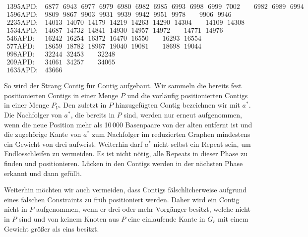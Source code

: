 \begin{footnotesize}
\begin{align*}
\text{1395APD:}&\ 6877\ \ \,6943\ \ \,6977\ \ \,6979\ \ \,6980\ \ \,6982\ \ \,6985\ \ \,6993\ \ \,6998\ \ \,6999\ \ \,7002\quad\quad 6982\ \ \, 6989\ \ \,6994\\
\text{1596APD:}&\ 9809\ \ \,9867\ \ \,9903\ \ \,9931\ \ \,9939\ \ \,9942\ \ \,9951\ \ \,9978\quad\quad 9906\ \ \,9946\\
\text{2235APD:}&\ 14013\ \ \,14070\ \ \,14179\ \ \,14219\ \ \,14263\ \ \,14290\ \ \,14304\quad\quad 14109\ \ \,14308\\
\text{1534APD:}&\ 14687\ \ \,14732\ \ \,14841\ \ \,14930\ \ \,14957\ \ \,14972\quad\quad 14771\ \ \,14976\\
\text{546APD:}&\ 16242\ \ \,16254\ \ \,16372\ \ \,16470\ \ \,16550\quad\quad 16293\ \ \,16554\\
\text{577APD:}&\ 18659\ \ \,18782\ \ \,18967\ \ \,19040\ \ \,19081\quad\quad 18698\ \ \,19044\\
\text{998APD:}&\ 32244\ \ \,32453\quad\quad 32248\\
\text{209APD:}&\ 34061\ \ \,34257\quad\quad 34065\\
\text{1635APD:}&\ 43666
\end{align*}
\end{footnotesize}

So wird der Strang Contig für Contig aufgebaut. Wir sammeln die bereits fest positionierten Contigs in einer Menge $P$ und die vorläufig positionierten Contigs in einer Menge $P_V$. %
Den zuletzt in $P$ hinzugefügten Contig bezeichnen wir mit $a^*$.
Die Nachfolger von $a^*$, die bereits in $P$ sind, werden 
nur erneut aufgenommen, wenn die neue Position mehr als 10\,000 Basenpaare von der alten entfernt ist und die zugehörige Kante von $a^*$ zum Nachfolger im reduzierten Graphen mindestens ein Gewicht von drei aufweist. 
Weiterhin darf $a^*$ nicht selbst ein Repeat sein, um Endlosschleifen zu vermeiden.
Es ist nicht nötig, alle Repeats in dieser Phase zu finden und positionieren. Lücken in den Contigs werden in der nächsten Phase erkannt und dann gefüllt.

Weiterhin möchten wir auch vermeiden, dass Contigs fälschlicherweise aufgrund eines falschen Constraints zu früh positioniert werden.
Daher wird ein Contig nicht in $P$ aufgenommen, wenn er drei oder mehr Vorgänger besitzt, welche nicht in $P$ sind und von keinem Knoten aus $P$ eine einlaufende Kante in $G_r$ mit einem Gewicht größer als eins besitzt.

